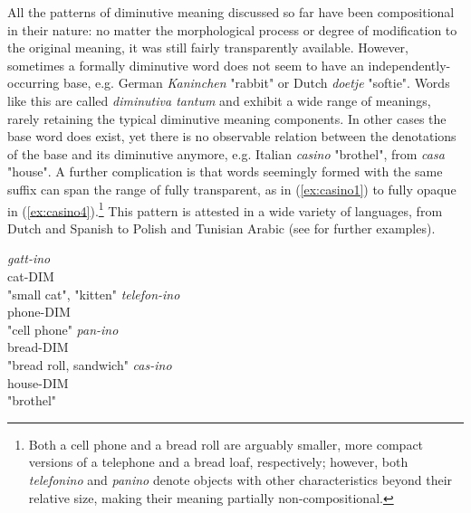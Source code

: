All the patterns of diminutive meaning discussed so far have been compositional in their nature: no matter the morphological process or degree of modification to the original meaning, it was still fairly transparently available. However, sometimes a formally diminutive word does not seem to have an independently-occurring base, e.g. German \textit{Kaninchen} "rabbit" or Dutch \textit{doetje} "softie". Words like this are called \textit{diminutiva tantum} and exhibit a wide range of meanings, rarely retaining the typical diminutive meaning components. In other cases the base word does exist, yet there is no observable relation between the denotations of the base and its diminutive anymore, e.g. Italian \textit{casino} "brothel", from \textit{casa} "house". A further complication is that words seemingly formed with the same suffix can span the range of fully transparent, as in (\ref{ex:casino1}) to fully opaque in (\ref{ex:casino4}).\footnote{Both a cell phone and a bread roll are arguably smaller, more compact versions of a telephone and a bread loaf, respectively; however, both \textit{telefonino} and \textit{panino} denote objects with other characteristics beyond their relative size, making their meaning partially non-compositional.} This pattern is attested in a wide variety of languages, from Dutch and Spanish to Polish and Tunisian Arabic (see \citeauthor{DeBelder+etal+2014} \citeyear{DeBelder+etal+2014} for further examples).
\begin{exe}
\ex \label{ex:casino} 
\begin{multicols}{2}
\begin{xlist}
\ex \label{ex:casino1} \gll
\textit{gatt-ino} \\
cat-DIM \\
\trans "small cat", "kitten"
\ex \label{ex:casino2} \gll
\textit{telefon-ino} \\
phone-DIM \\
\trans "cell phone"
\columnbreak
\ex \label{ex:casino3} \gll
\textit{pan-ino} \\
bread-DIM \\
\trans "bread roll, sandwich"
\ex \label{ex:casino4} \gll
\textit{cas-ino} \\
house-DIM \\
\trans "brothel"
\end{xlist}
\end{multicols}
\end{exe}

